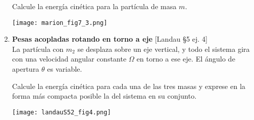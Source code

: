 \documentclass[11pt, spanish, a4paper, twoside]{article}
\begin{document}
\begin{enumerate}
\begin{minipage}[t][7cm]{0.55\textwidth}
				Calcule la energía cinética para la partícula de masa \(m\).
				\end{minipage}
			\begin{minipage}[c][3cm][t]{0.5\textwidth}
				\texttt{[image: marion\_fig7\_3.png]}
			\end{minipage}



		\item \begin{minipage}[t][4.5cm]{0.65\textwidth}
			\textbf{Pesas acopladas rotando en torno a eje} [Landau \S5 ej. 4]\\
			La partícula con \(m_2\) se desplaza sobre un eje vertical, y todo el sistema gira con una velocidad angular constante \(\Omega\) en torno a ese eje.
			El ángulo de apertura \(\theta\) es variable.

			Calcule la energía cinética para cada una de las tres masas y exprese en la forma más compacta posible la del sistema en su conjunto.
		\end{minipage}
			\begin{minipage}[c][5cm][t]{0.35\textwidth}
			\texttt{[image: landauS52\_fig4.png]}
		\end{minipage}




\end{enumerate}
\end{document}
